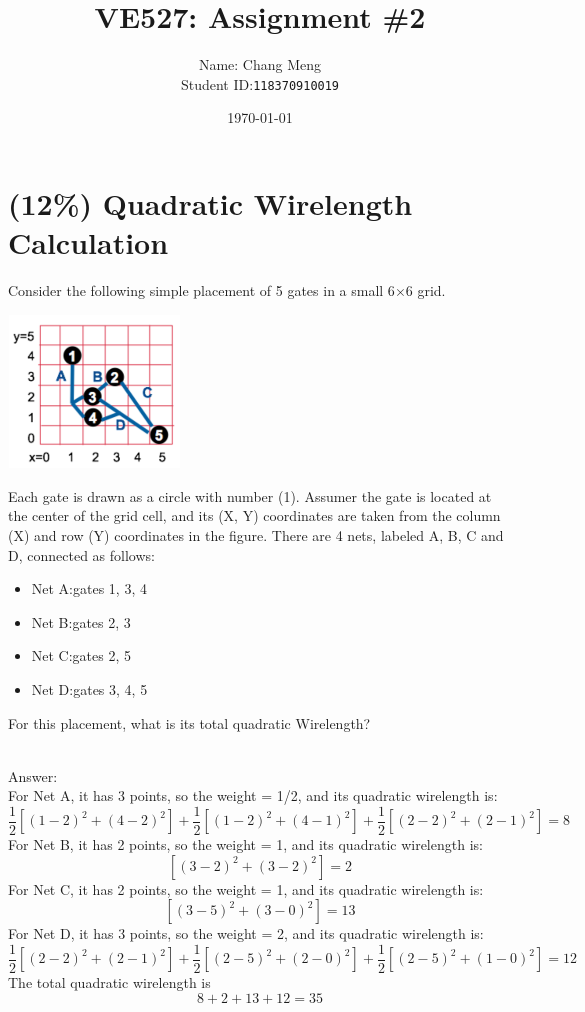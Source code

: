 \documentclass[12pt]{article}
\title{VE527: Assignment \#2} %
\author{Name: Chang Meng\\Student ID:\@\texttt{118370910019}}
\date{\today}
\begin{document}
    \maketitle

    \section{(12\%) Quadratic Wirelength Calculation}

        Consider the following simple placement of 5 gates in a small 6$\times$6 grid.

        \begin{center}
            \includegraphics[width = 1.80in, height = 1.60in]{figure1.png}
        \end{center}

        \noindent
        Each gate is drawn as a circle with number (1). Assumer the gate is located at the
        center of the grid cell, and its (X, Y) coordinates are taken from the column (X) and
        row (Y) coordinates in the figure. There are 4 nets, labeled A, B, C and D, connected
        as follows:

        \begin{itemize}
            \item Net A:\@ gates 1, 3, 4
            \item Net B:\@ gates 2, 3
            \item Net C:\@ gates 2, 5
            \item Net D:\@ gates 3, 4, 5
        \end{itemize}

        \noindent
        For this placement, what is its total quadratic Wirelength?

        \noindent
        \\Answer:\\

        \noindent
        For Net A, it has 3 points, so the weight = 1/2, and its quadratic wirelength is:
        \[\frac{1}{2}[{(1-2)}^2+{(4-2)}^2]+\frac{1}{2}[{(1-2)}^2+{(4-1)}^2]+
        \frac{1}{2}[{(2-2)}^2+{(2-1)}^2]=8\]
        For Net B, it has 2 points, so the weight = 1, and its quadratic wirelength is:
        \[[{(3-2)}^2+{(3-2)}^2]=2\]
        For Net C, it has 2 points, so the weight = 1, and its quadratic wirelength is:
        \[[{(3-5)}^2+{(3-0)}^2]=13\]
        For Net D, it has 3 points, so the weight = 2, and its quadratic wirelength is:
        \[\frac{1}{2}[{(2-2)}^2+{(2-1)}^2]+\frac{1}{2}[{(2-5)}^2+{(2-0)}^2]+
        \frac{1}{2}[{(2-5)}^2+{(1-0)}^2]=12\]
        The total quadratic wirelength is
        \[8+2+13+12=35\]
\end{document}
